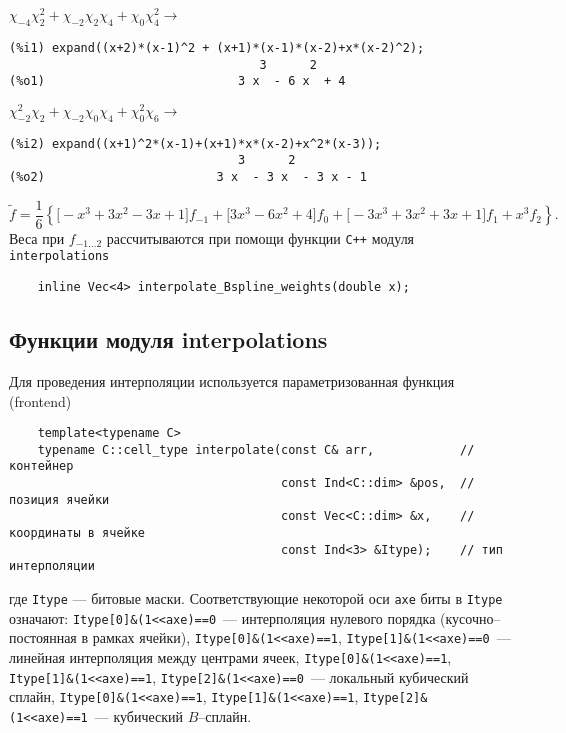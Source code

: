 $\chi_{-4}\chi_2^2 + \chi_{-2}\chi_2\chi_4 + \chi_0\chi_4^2\to$
\begin{verbatim}
(%i1) expand((x+2)*(x-1)^2 + (x+1)*(x-1)*(x-2)+x*(x-2)^2);
                                   3      2
(%o1)                           3 x  - 6 x  + 4
\end{verbatim}

$ \chi_{-2}^2\chi_{2} + \chi_{-2}\chi_{0}\chi_4 + \chi_{0}^2\chi_6\to$
\begin{verbatim}
(%i2) expand((x+1)^2*(x-1)+(x+1)*x*(x-2)+x^2*(x-3));
                                3      2
(%o2)                        3 x  - 3 x  - 3 x - 1
\end{verbatim}
$$
\widetilde f = \frac16\left\{ \Big[-x^3 +3x^2-3x+1 \Big]f_{-1} +  \Big[3x^3-6x^2+4\Big] f_0 + \Big[-3x^3+3x^2+3x+1\Big] f_1 + x^3 f_2 \right\}.
$$
Веса при $f_{-1...2}$ рассчитываются при помощи функции \verb'C++' модуля \verb'interpolations'
\begin{verbatim}
    inline Vec<4> interpolate_Bspline_weights(double x);
\end{verbatim}


\subsection{Функции модуля {\sf interpolations}}
Для проведения интерполяции используется параметризованная функция (frontend)
\begin{verbatim}
    template<typename C>
    typename C::cell_type interpolate(const C& arr,            // контейнер
                                      const Ind<C::dim> &pos,  // позиция ячейки
                                      const Vec<C::dim> &x,    // координаты в ячейке
                                      const Ind<3> &Itype);    // тип интерполяции
\end{verbatim}
где \verb'Itype' --- битовые маски. Соответствующие некоторой оси \verb'axe' биты в \verb'Itype' означают:
\verb'Itype[0]&(1<<axe)==0'~--- интерполяция нулевого порядка (кусочно--постоянная
в рамках ячейки), \verb'Itype[0]&(1<<axe)==1', \verb'Itype[1]&(1<<axe)==0'~--- линейная интерполяция между центрами ячеек,
\verb'Itype[0]&(1<<axe)==1', \verb'Itype[1]&(1<<axe)==1', \verb'Itype[2]&(1<<axe)==0'~--- локальный кубический сплайн,
\verb'Itype[0]&(1<<axe)==1', \verb'Itype[1]&(1<<axe)==1', \verb'Itype[2]&(1<<axe)==1'~--- кубический $B$--сплайн.




